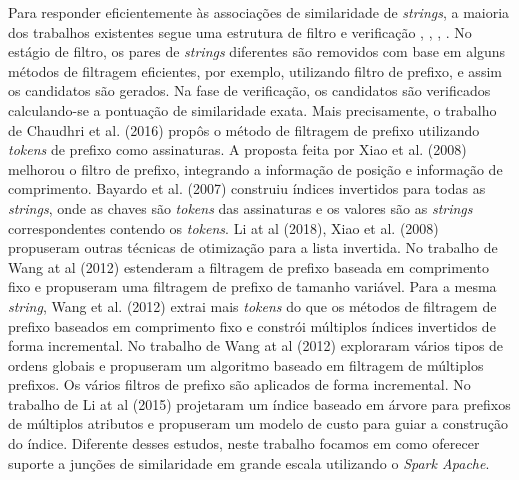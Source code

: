 Para responder eficientemente às associações de similaridade de \textit{strings}, a maioria dos trabalhos existentes segue uma estrutura de filtro e verificação \cite{Li:2008:EMF:1546682.1547171}, \cite{Wang:2012:WBP:2213836.2213847}, \cite{Rong:2013:6319300}, \cite{Li:2015:ESJ:2723372.2723733}. No estágio de filtro, os pares de \textit{strings} diferentes são removidos com base em alguns métodos de filtragem eficientes, por exemplo, utilizando filtro de prefixo, e assim os candidatos são gerados. Na fase de verificação, os candidatos são verificados calculando-se a pontuação de similaridade exata. Mais precisamente, o trabalho de Chaudhri et al. (2016)\cite{Chaudhuri:2006:POS:1129754.1129865} propôs o método de filtragem de prefixo utilizando \textit{tokens} de prefixo como assinaturas. A proposta feita por Xiao et al. (2008)\cite{Xiao:2008:ESJ:1367497.1367516} melhorou o filtro de prefixo, integrando a informação de posição e informação de comprimento. Bayardo et al. (2007) \cite{Bayardo:2007:SUP:1242572.1242591} construiu índices invertidos para todas as \textit{strings}, onde as chaves são \textit{tokens} das assinaturas e os valores são as \textit{strings} correspondentes contendo os \textit{tokens}. Li at al (2018)\cite{Li:2008:EMF:1546682.1547171}, Xiao et al. (2008)\cite{Xiao:2008:ESJ:1367497.1367516} propuseram outras técnicas de otimização para a lista invertida. No trabalho de Wang at al (2012)\cite{Wang:2012:WBP:2213836.2213847} estenderam a filtragem de prefixo baseada em comprimento fixo e propuseram uma filtragem de prefixo de tamanho variável. Para a mesma \textit{string}, Wang et al. (2012)\cite{Wang:2012:WBP:2213836.2213847} extrai mais \textit{tokens} do que os métodos de filtragem de prefixo baseados em comprimento fixo e constrói múltiplos índices invertidos de forma incremental. No trabalho de Wang at al (2012)\cite{Wang:2012:WBP:2213836.2213847} exploraram vários tipos de ordens globais e propuseram um algoritmo baseado em filtragem de múltiplos prefixos. Os vários filtros de prefixo são aplicados de forma incremental. No trabalho de Li at al (2015)\cite{Li:2015:ESJ:2723372.2723733} projetaram um índice baseado em árvore para prefixos de múltiplos atributos e propuseram um modelo de custo para guiar a construção do índice. Diferente desses estudos, neste trabalho focamos em como oferecer suporte a junções de similaridade em grande escala utilizando o \textit{Spark Apache}.

